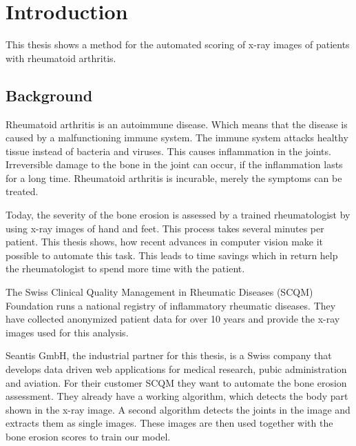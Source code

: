 \documentclass[12pt]{article}
\begin{document}
\newpage

\tableofcontents

\newpage

\section{Introduction}

This thesis shows a method for the automated scoring of x-ray images of patients with rheumatoid arthritis.

\subsection{Background}

Rheumatoid arthritis is an autoimmune disease. Which means that the disease is caused by a malfunctioning immune system. The immune system attacks healthy tissue instead of bacteria and viruses. This causes inflammation in the joints. Irreversible damage to the bone in the joint can occur, if the inflammation lasts for a long time. \cite{rheuma} Rheumatoid arthritis is incurable, merely the symptoms can be treated.

Today, the severity of the bone erosion is assessed by a trained rheumatologist by using x-ray images of hand and feet. This process takes several minutes per patient. This thesis shows, how recent advances in computer vision make it possible to automate this task. This leads to time savings which in return help the rheumatologist to spend more time with the patient.

The Swiss Clinical Quality Management in Rheumatic Diseases (SCQM) Foundation runs a national registry of inflammatory rheumatic diseases. \cite{scqm_about} They have collected anonymized patient data for over 10 years and provide the x-ray images used for this analysis.

Seantis GmbH, the industrial partner for this thesis, is a Swiss company that develops data driven web applications for medical research, pubic administration and aviation. \cite{seantis_about} For their customer SCQM they want to automate the bone erosion assessment. They already have a working algorithm, which detects the body part shown in the x-ray image. A second algorithm detects the joints in the image and extracts them as single images. These images are then used together with the bone erosion scores to train our model.

\end{document}
